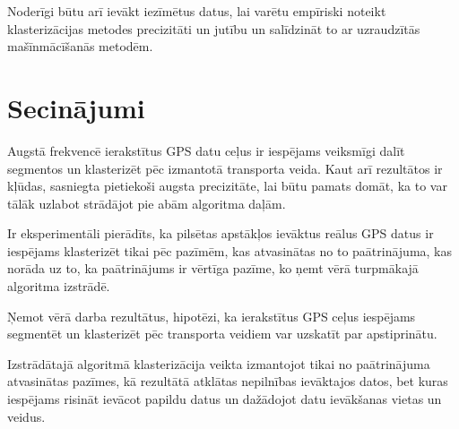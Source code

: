 \documentclass{ludis}
\begin{document}
Noderīgi būtu arī ievākt iezīmētus datus, lai varētu empīriski noteikt klasterizācijas metodes
precizitāti un jutību un salīdzināt to ar uzraudzītās mašīnmācīšanās metodēm.

\chapter{Secinājumi}
Augstā frekvencē ierakstītus GPS datu ceļus ir iespējams veiksmīgi dalīt segmentos un klasterizēt
pēc izmantotā transporta veida. Kaut arī rezultātos ir kļūdas, sasniegta pietiekoši augsta
precizitāte, lai būtu pamats domāt, ka to var tālāk uzlabot strādājot pie abām algoritma
daļām. 

Ir eksperimentāli pierādīts, ka pilsētas apstākļos ievāktus reālus GPS datus ir iespējams
klasterizēt tikai pēc pazīmēm, kas atvasinātas no to paātrinājuma, kas norāda uz to, 
ka \linebreak paātrinājums ir vērtīga pazīme, ko ņemt vērā turpmākajā algoritma izstrādē.

Ņemot vērā darba rezultātus, hipotēzi, ka ierakstītus GPS ceļus iespējams segmentēt un klasterizēt
pēc transporta veidiem var uzskatīt par apstiprinātu.

Izstrādātajā algoritmā klasterizācija veikta izmantojot tikai no paātrinājuma atvasinātas pazīmes,
kā rezultātā atklātas nepilnības ievāktajos datos, bet kuras iespējams risināt ievācot papildu
datus un dažādojot datu ievākšanas vietas un veidus.

\end{document}
